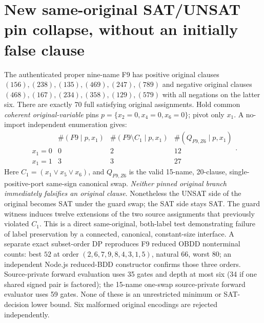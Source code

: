 \documentclass[11pt]{article}
\begin{document}
\section{New same-original SAT/UNSAT pin collapse, without an initially false clause}
The authenticated proper nine-name F9 has positive original clauses
$(156),(238),(135),(469),(247),(789)$ and negative original clauses
$(468),(167),(234),(358),(129),(579)$ with all negations on the latter six. There are exactly 70 full satisfying original assignments.
Hold common \emph{coherent original-variable} pins $p=\{x_2=0,x_4=0,x_6=0\}$; pivot only $x_1$. A no-import independent enumeration gives:
\[
\begin{array}{l|rrr}
&\#(F9\mid p,x_1)&\#(F9\setminus C_1\mid p,x_1)&
\#(Q_{F9,Z6}\mid p,x_1)\\\hline
x_1=0&0&2&12\\
x_1=1&3&3&27
\end{array}.
\]
Here $C_1=(x_1\vee x_5\vee x_6)$, and $Q_{F9,Z6}$ is the valid 15-name, 20-clause, single-positive-port same-sign canonical swap. \emph{Neither pinned original branch immediately falsifies an original clause}. Nonetheless the UNSAT side of the original becomes SAT under the guard swap; the SAT side stays SAT. The guard witness induces twelve extensions of the two source assignments that previously violated $C_1$. This is a direct same-original, both-label test demonstrating failure of label preservation by a connected, canonical, constant-size interface.
A separate exact subset-order DP reproduces F9 reduced OBDD nonterminal counts: best $52$ at order $(2,6,7,9,8,4,3,1,5)$, natural $66$, worst $80$; an independent Node.js reduced-BDD constructor confirms those three orders. Source-private forward evaluation uses 35 gates and depth at most six (34 if one shared signed pair is factored); the 15-name one-swap source-private forward evaluator uses 59 gates. None of these is an unrestricted minimum or SAT-decision lower bound. Six malformed original encodings are rejected independently.
\end{document}
